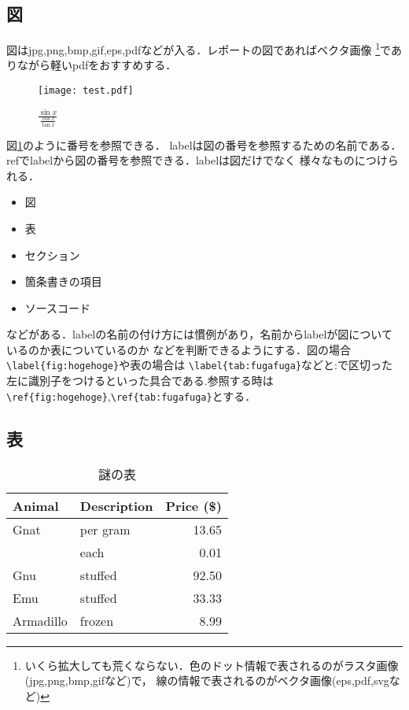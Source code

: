\documentclass[a4j,titlepage,dvipdfmx,uplatex]{jsarticle}   %
\begin{document}
  \subsection{図}
  図はjpg,png,bmp,gif,eps,pdfなどが入る．レポートの図であればベクタ画像%
  \footnote{いくら拡大しても荒くならない．色のドット情報で表されるのがラスタ画像(jpg,png,bmp,gifなど)で，
  線の情報で表されるのがベクタ画像(eps,pdf,svgなど)}でありながら軽いpdfをおすすめする．
  \begin{figure}[H]
    \centering
    \texttt{[image: test.pdf]}
    \caption{$\frac{\sin{x}}{\frac{\cos{x}}{\tan{x}}}$}
    \label{fig:tri}
  \end{figure}
  図\ref{fig:tri}のように番号を参照できる．
  labelは図の番号を参照するための名前である．refでlabelから図の番号を参照できる．labelは図だけでなく
  様々なものにつけられる．
  \begin{itemize}
    \item 図
    \item 表
    \item セクション
    \item 箇条書きの項目
    \item ソースコード
  \end{itemize}
  などがある．labelの名前の付け方には慣例があり，名前からlabelが図についているのか表についているのか
  などを判断できるようにする．図の場合\verb|\label{fig:hogehoge}|や表の場合は
  \verb|\label{tab:fugafuga}|などと:で区切った左に識別子をつけるといった具合である.参照する時は
  \verb|\ref{fig:hogehoge}|,\verb|\ref{tab:fugafuga}|とする．

  \subsection{表}
  \begin{table}[H]
    \centering
    \caption{謎の表}
    \label{tab:testTab}
    \begin{tabular}{|l|l|r|}
      \hline
      Animal      & Description  & Price (\$) \\ \hline
      Gnat        & per gram     & 13.65      \\ \hline
                  & each         & 0.01       \\ \hline
      Gnu         & stuffed      & 92.50      \\ \hline
      Emu         & stuffed      & 33.33      \\ \hline
      Armadillo   & frozen       & 8.99       \\ \hline
    \end{tabular}
  \end{table}
\end{document}
